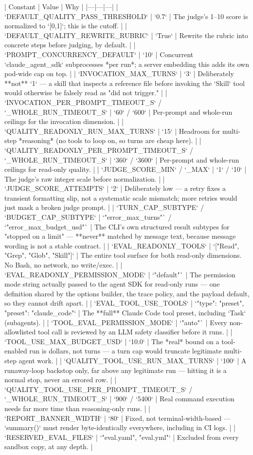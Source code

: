 | Constant | Value | Why |
|---|---|---|
| `DEFAULT_QUALITY_PASS_THRESHOLD` | `0.7` | The judge's 1–10 score is normalized to `[0,1]`; this is the cutoff. |
| `DEFAULT_QUALITY_REWRITE_RUBRIC` | `True` | Rewrite the rubric into concrete steps before judging, by default. |
| `PROMPT_CONCURRENCY_DEFAULT` | `10` | Concurrent `claude_agent_sdk` subprocesses *per run*; a server embedding this adds its own pod-wide cap on top. |
| `INVOCATION_MAX_TURNS` | `3` | Deliberately **not** `1` — a skill that inspects a reference file before invoking the `Skill` tool would otherwise be falsely read as "did not trigger." |
| `INVOCATION_PER_PROMPT_TIMEOUT_S` / `_WHOLE_RUN_TIMEOUT_S` | `60` / `600` | Per-prompt and whole-run ceilings for the invocation dimension. |
| `QUALITY_READONLY_RUN_MAX_TURNS` | `15` | Headroom for multi-step *reasoning* (no tools to loop on, so turns are cheap here). |
| `QUALITY_READONLY_PER_PROMPT_TIMEOUT_S` / `_WHOLE_RUN_TIMEOUT_S` | `360` / `3600` | Per-prompt and whole-run ceilings for read-only quality. |
| `JUDGE_SCORE_MIN` / `_MAX` | `1` / `10` | The judge's raw integer scale before normalization. |
| `JUDGE_SCORE_ATTEMPTS` | `2` | Deliberately low — a retry fixes a transient formatting slip, not a systematic scale mismatch; more retries would just mask a broken judge prompt. |
| `TURN_CAP_SUBTYPE` / `BUDGET_CAP_SUBTYPE` | `"error_max_turns"` / `"error_max_budget_usd"` | The CLI's own structured result subtypes for "stopped on a limit" — **never** matched by message text, because message wording is not a stable contract. |
| `EVAL_READONLY_TOOLS` | `["Read", "Grep", "Glob", "Skill"]` | The entire tool surface for both read-only dimensions. No Bash, no network, no write/exec. |
| `EVAL_READONLY_PERMISSION_MODE` | `"default"` | The permission mode string actually passed to the agent SDK for read-only runs — one definition shared by the options builder, the trace policy, and the payload default, so they cannot drift apart. |
| `EVAL_TOOL_USE_TOOLS` | `{"type": "preset", "preset": "claude_code"}` | The **full** Claude Code tool preset, including `Task` (subagents). |
| `TOOL_EVAL_PERMISSION_MODE` | `"auto"` | Every non-allowlisted tool call is reviewed by an LLM safety classifier before it runs. |
| `TOOL_USE_MAX_BUDGET_USD` | `10.0` | The *real* bound on a tool-enabled run is dollars, not turns — a turn cap would truncate legitimate multi-step agent work. |
| `QUALITY_TOOL_USE_RUN_MAX_TURNS` | `100` | A runaway-loop backstop only, far above any legitimate run — hitting it is a normal stop, never an errored row. |
| `QUALITY_TOOL_USE_PER_PROMPT_TIMEOUT_S` / `_WHOLE_RUN_TIMEOUT_S` | `900` / `5400` | Real command execution needs far more time than reasoning-only runs. |
| `REPORT_BANNER_WIDTH` | `80` | Fixed, not terminal-width-based — `summary()` must render byte-identically everywhere, including in CI logs. |
| `RESERVED_EVAL_FILES` | `{"eval.yaml", "eval.yml"}` | Excluded from every sandbox copy, at any depth. |

